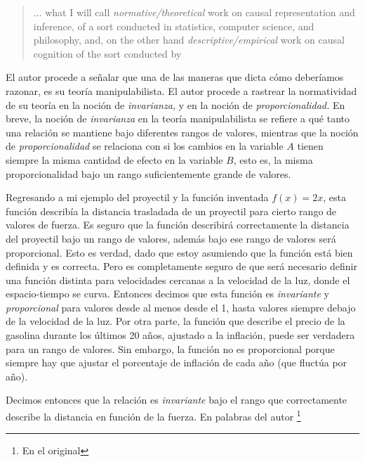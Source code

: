 {{\begin{quote}
  $\ldots$ what I will call \emph{normative/theoretical}
  work on causal representation and inference, of a sort
  conducted in statistics, computer science, and philosophy,
  and, on the other hand \emph{descriptive/empirical} work
  on causal cognition of the sort conducted by
\end{quote}

El autor procede a señalar que una de las maneras que dicta
cómo deberíamos razonar, es su teoría manipulabilista. El
autor procede a rastrear la normatividad de su teoría en la
noción de \emph{invarianza,} y en la noción de
\emph{proporcionalidad.} En breve, la noción de
\emph{invarianza} en la teoría manipulabilista se refiere a
qué tanto una relación se mantiene bajo diferentes rangos
de valores, mientras que la noción de
\emph{proporcionalidad} se relaciona con si los cambios en
la variable $ A $ tienen siempre la misma cantidad de efecto
en la variable $ B $, esto es,  la misma proporcionalidad
bajo un rango suficientemente grande de valores.


Regresando a mi ejemplo del proyectil y la función inventada
$ f(x) = 2x $, esta función describía la distancia
trasladada de un proyectil para cierto rango de valores de
fuerza. Es seguro que la función describirá correctamente la
distancia del proyectil bajo un rango de valores, además
bajo ese rango de valores será proporcional. Esto es verdad,
dado que estoy asumiendo que la función está bien definida y
es correcta. Pero es completamente seguro de que será
necesario definir una función distinta para velocidades
cercanas a la velocidad de la luz, donde el espacio-tiempo
se curva. Entonces decimos que esta función es
\emph{invariante} y \emph{proporcional} para valores desde
al menos desde el 1, hasta valores siempre debajo de la
velocidad de la luz. Por otra parte, la función que describe
el precio de la gasolina durante los últimos 20 años,
ajustado a la inflación, puede ser verdadera para un rango
de valores. Sin embargo, la función no es proporcional
porque siempre hay que ajustar el porcentaje de inflación de
cada año (que fluctúa por año).

Decimos entonces  que la relación es \emph{invariante} bajo
el rango que correctamente describe la distancia en función
de la fuerza. En palabras del autor \footnote{
    En el original 
}

}}
